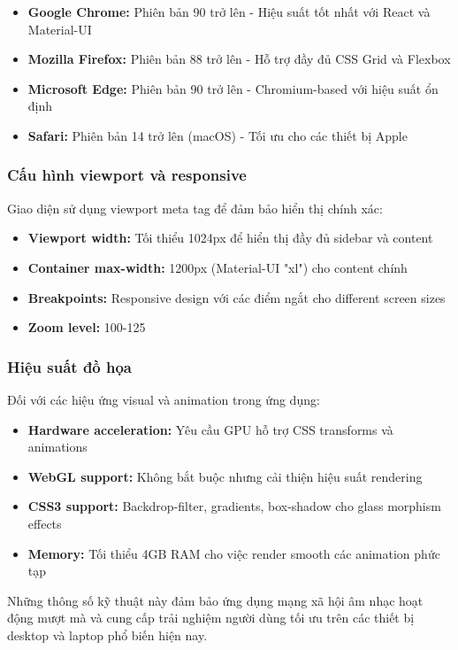 \begin{itemize}
    \item \textbf{Google Chrome:} Phiên bản 90 trở lên - Hiệu suất tốt nhất với React và Material-UI
    \item \textbf{Mozilla Firefox:} Phiên bản 88 trở lên - Hỗ trợ đầy đủ CSS Grid và Flexbox
    \item \textbf{Microsoft Edge:} Phiên bản 90 trở lên - Chromium-based với hiệu suất ổn định
    \item \textbf{Safari:} Phiên bản 14 trở lên (macOS) - Tối ưu cho các thiết bị Apple
\end{itemize}

\subsubsection{Cấu hình viewport và responsive}

Giao diện sử dụng viewport meta tag để đảm bảo hiển thị chính xác:

\begin{itemize}
    \item \textbf{Viewport width:} Tối thiểu 1024px để hiển thị đầy đủ sidebar và content
    \item \textbf{Container max-width:} 1200px (Material-UI "xl") cho content chính
    \item \textbf{Breakpoints:} Responsive design với các điểm ngắt cho different screen sizes
    \item \textbf{Zoom level:} 100-125%
\end{itemize}

\subsubsection{Hiệu suất đồ họa}

Đối với các hiệu ứng visual và animation trong ứng dụng:

\begin{itemize}
    \item \textbf{Hardware acceleration:} Yêu cầu GPU hỗ trợ CSS transforms và animations
    \item \textbf{WebGL support:} Không bắt buộc nhưng cải thiện hiệu suất rendering
    \item \textbf{CSS3 support:} Backdrop-filter, gradients, box-shadow cho glass morphism effects
    \item \textbf{Memory:} Tối thiểu 4GB RAM cho việc render smooth các animation phức tạp
\end{itemize}

Những thông số kỹ thuật này đảm bảo ứng dụng mạng xã hội âm nhạc hoạt động mượt mà và cung cấp trải nghiệm người dùng tối ưu trên các thiết bị desktop và laptop phổ biến hiện nay. 